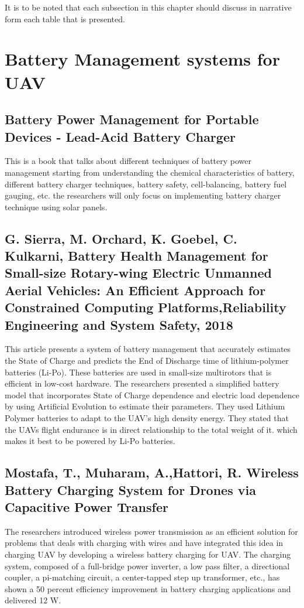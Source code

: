 It is to be noted that each subsection in this chapter should discuss in narrative form each table that is presented.  

\section{Battery Management systems for UAV}

\subsection{Battery Power Management for Portable Devices - Lead-Acid Battery Charger}
This is a book that talks about different techniques of battery power management starting from understanding the chemical characteristics of battery, different battery charger techniques, battery safety, cell-balancing, battery fuel gauging, etc. the researchers will only focus on implementing battery charger technique using solar panels. 

\subsection{G. Sierra, M. Orchard, K. Goebel, C. Kulkarni, Battery Health Management for Small-size Rotary-wing Electric Unmanned Aerial Vehicles: An Efficient Approach for Constrained Computing Platforms,Reliability Engineering and System Safety, 2018}
This article presents a system of battery management that accurately estimates the State of Charge and predicts the End of Discharge time of lithium-polymer batteries (Li-Po). These batteries are used in small-size multirotors that is efficient in low-cost hardware. The researchers presented a simplified battery model that incorporates State of Charge dependence and electric load dependence by using Artificial Evolution to estimate their parameters. They used Lithium Polymer batteries to adapt to the UAV’s high density energy. They stated that the UAVs flight endurance is in direct relationship to the total weight of it. which makes it best to be powered by Li-Po batteries.
\subsection{Mostafa, T., Muharam, A.,Hattori, R. Wireless Battery Charging System for Drones via Capacitive Power Transfer}

The researchers introduced wireless power transmission as an efficient solution for problems that deals with charging with wires and have integrated this idea in charging UAV by developing a wireless battery charging for UAV. The charging system, composed of a full-bridge power inverter, a low pass filter, a directional coupler, a pi-matching circuit, a center-tapped step up transformer, etc., has shown a 50 percent efficiency improvement in battery charging applications and delivered 12 W.

